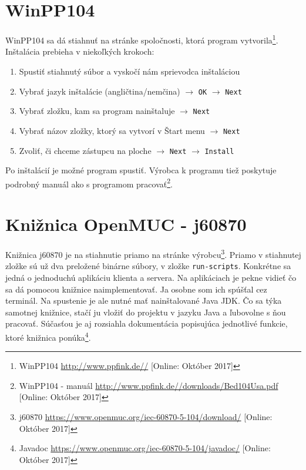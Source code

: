 \section{WinPP104}
\label{Ako_Win}
\tab WinPP104 sa dá stiahnuť na stránke spoločnosti, ktorá program vytvorila\footnote{WinPP104 \url{http://www.ppfink.de//} [Online: Október 2017]}. 
Inštalácia prebieha v niekoľkých krokoch:
\begin{enumerate}
\item Spustiť stiahnutý súbor a vyskočí nám sprievodca inštaláciou
\item Vybrať jazyk inštalácie (angličtina/nemčina) $\rightarrow$ {\tt OK} $\rightarrow$ {\tt Next}
\item Vybrať zložku, kam sa program nainštaluje $\rightarrow$ {\tt Next}
\item Vybrať názov zložky, ktorý sa vytvorí v Štart menu $\rightarrow$ {\tt Next}
\item Zvoliť, či chceme zástupcu na ploche $\rightarrow$ {\tt Next} $\rightarrow$ {\tt Install}
\end{enumerate} \par
Po inštalácií je možné program spustiť. Výrobca k programu tiež poskytuje podrobný manuál ako s programom pracovať\footnote{WinPP104 - manuál \url{http://www.ppfink.de//downloads/Bed104Usa.pdf} [Online: Október 2017]}.

\section{Knižnica OpenMUC - j60870}
\label{Ako_Open}
\tab Knižnica j60870 je na stiahnutie priamo na stránke výrobcu\footnote{j60870 \url{https://www.openmuc.org/iec-60870-5-104/download/} [Online: Október 2017]}. Priamo v stiahnutej zložke sú už dva preložené binárne súbory, v zložke {\tt run-scripts}. Konkrétne sa jedná o jednoduchú aplikáciu klienta a servera. Na aplikáciach je pekne vidieť čo sa dá pomocou knižnice naimplementovať. Ja osobne som ich spúšťal cez terminál. Na spustenie je ale nutné mať nainštalované Java JDK. Čo sa týka samotnej knižnice, stačí ju vložiť do projektu v jazyku Java a ľubovolne s ňou pracovať. Súčasťou je aj rozsiahla dokumentácia popisujúca jednotlivé funkcie, ktoré knižnica ponúka\footnote{Javadoc \url{https://www.openmuc.org/iec-60870-5-104/javadoc/} [Online: Október 2017]}.

